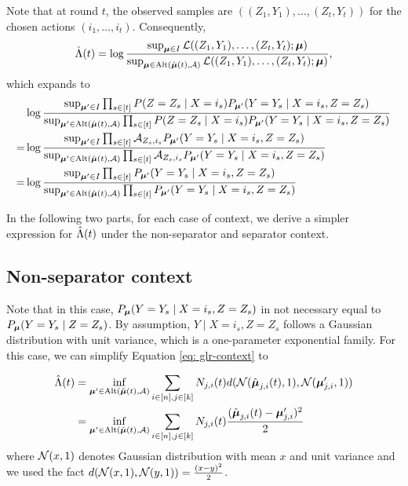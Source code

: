     Note that at round $t$, the observed samples are $((Z_1, Y_1), \dots, (Z_t, Y_t))$ for the chosen actions $(i_1, \dots, i_t)$. Consequently,     
        $$
            \hat{\Lambda}(t) = \log \frac{\sup_{\boldsymbol{\mu} \in I} \mathcal{L}((Z_1, Y_1), \dots, (Z_t, Y_t); \boldsymbol{\mu})}{\sup_{\boldsymbol{\mu} \in \text{Alt}(\hat{\boldsymbol{\mu}}(t), \mathcal{A})} \mathcal{L}((Z_1, Y_1), \dots, (Z_t, Y_t); \boldsymbol{\mu})},
        $$
    which expands to
        \begin{align}\label{eq: glr-context}    
                  & \log \frac{\sup_{\boldsymbol{\mu}' \in I} \prod_{s \in [t]} P(Z = Z_s \mid X = i_s) P_{\boldsymbol{\mu}'} (Y = Y_s \mid X = i_s, Z = Z_s)}{\sup_{\boldsymbol{\mu}' \in \text{Alt}(\hat{\boldsymbol{\mu}}(t), \mathcal{A})} \prod_{s \in [t]} P(Z = Z_s \mid X = i_s) P_{\boldsymbol{\mu}'} (Y = Y_s \mid X = i_s, Z = Z_s)} \nonumber \\
                  =  & \log \frac{\sup_{\boldsymbol{\mu}' \in I} \prod_{s \in [t]} \mathcal{A}_{Z_s, i_s} P_{\boldsymbol{\mu}'} (Y = Y_s \mid X = i_s, Z = Z_s)}{\sup_{\boldsymbol{\mu}' \in \text{Alt}(\hat{\boldsymbol{\mu}}(t), \mathcal{A})} \prod_{s \in [t]} \mathcal{A}_{Z_s, i_s} P_{\boldsymbol{\mu}'} (Y = Y_s \mid X = i_s, Z = Z_s)} \nonumber \\
                  = & \log \frac{\sup_{\boldsymbol{\mu}' \in I} \prod_{s \in [t]} P_{\boldsymbol{\mu}'} (Y = Y_s \mid X = i_s, Z = Z_s)}{\sup_{\boldsymbol{\mu}' \in \text{Alt}(\hat{\boldsymbol{\mu}}(t), \mathcal{A})} \prod_{s \in [t]} P_{\boldsymbol{\mu}'} (Y = Y_s \mid X = i_s, Z = Z_s)} 
        \end{align}
    
    In the following two parts, for each case of context, we derive a simpler expression for $\hat{\Lambda}(t)$ under the non-separator and separator context.
    
    \subsection{Non-separator context}\label{apd: glr-non-sep}
        Note that in this case, $P_{\boldsymbol{\mu}} (Y = Y_s \mid X = i_s, Z = Z_s)$ in not necessary equal to $P_{\boldsymbol{\mu}} (Y = Y_s \mid Z = Z_s)$. By assumption, $Y \mid X = i_s, Z = Z_s$ follows a Gaussian distribution with unit variance, which is a one-parameter exponential family. For this case, we can simplify Equation \eqref{eq: glr-context} to
   
        \begin{align*}
             \hat{\Lambda}(t) &= \inf_{\boldsymbol{\mu}' \in \text{Alt}(\hat{\boldsymbol{\mu}}(t), \mathcal{A})} \sum_{i \in [n], j \in [k]} N_{j,i}(t) d(\mathcal{N}(\hat{\boldsymbol{\mu}}_{j,i}(t), 1), \mathcal{N}(\boldsymbol{\mu}'_{j,i}, 1)) \\
                    &= \inf_{\boldsymbol{\mu}' \in \text{Alt}(\hat{\boldsymbol{\mu}}(t), \mathcal{A})} \sum_{i \in [n], j \in [k]} N_{j,i}(t) \frac{(\hat{\boldsymbol{\mu}}_{j,i}(t) - \boldsymbol{\mu}'_{j,i})^2}{2}
        \end{align*}
        where $\mathcal{N}(x, 1)$ denotes Gaussian distribution with mean $x$ and unit variance and we used the fact $d(\mathcal{N}(x, 1), \mathcal{N}(y, 1)) = \frac{(x - y)^2}{2}$.

